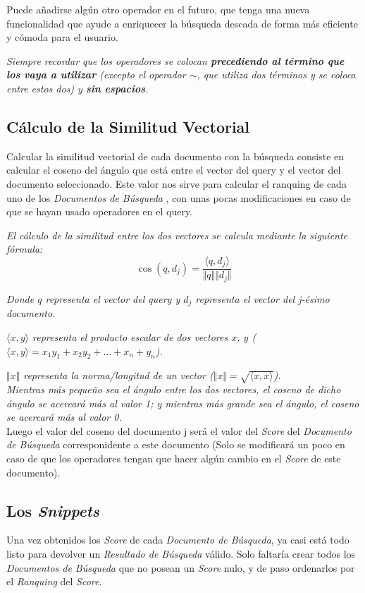 \documentclass[12pt]{article}
\newcommand{\SearchItems}{\emph{Documentos de Búsqueda} }
\newcommand{\SearchResult}{\emph{Resultado de Búsqueda} }
\begin{document}
	Puede añadirse algún otro operador en el futuro, que tenga una nueva funcionalidad que ayude a enriquecer la búsqueda deseada de forma más eficiente y cómoda para el usuario.
	
	\emph{Siempre recordar que los operadores se colocan \textbf{precediendo al término que los vaya a utilizar} (excepto el operador $\sim$, que utiliza dos términos y se coloca entre estos dos) y \textbf{sin espacios}.}
	
\subsection*{Cálculo de la Similitud Vectorial}
	Calcular la similitud vectorial de cada documento con la búsqueda consiste en calcular el coseno del ángulo que está entre el vector del query y el vector del documento seleccionado.
	Este valor nos sirve para calcular el ranquing de cada uno de los \SearchItems , con unas pocas modificaciones en caso de que se hayan usado operadores en el query.
	
	\emph{El cálculo de la similitud entre los dos vectores se calcula mediante la siguiente fórmula: }
	$$ \cos (q, d_j) = \frac{ \langle q, d_j \rangle }{ \Vert q \Vert \Vert d_j \Vert } $$
	
	\emph{Donde $q$ representa el vector del query y $d_j$ representa el vector del j-ésimo documento.}
	
	\emph{$ \langle x, y \rangle $ representa el producto escalar de dos vectores $x$, $y$ ($ \langle x, y \rangle = x_1 y_1 + x_2 y_2 + \ldots + x_n + y_n$).}
	
	\emph{$ \Vert x \Vert $ representa la norma/longitud de un vector ($ \Vert x \Vert = \sqrt{\langle x, x \rangle}$).} \\
	
	\emph{Mientras más pequeño sea el ángulo entre los dos vectores, el coseno de dicho ángulo se acercará más al valor 1; y mientras más grande sea el ángulo, el coseno se acercará más al valor 0.} \\
	
	Luego el valor del coseno del documento j será el valor del \emph{Score} del \emph{Documento de Búsqueda} corresponidente a este documento (Solo se modificará un poco en caso de que los operadores tengan que hacer algún cambio en el \emph{Score} de este documento).
	
\subsection*{Los \emph{Snippets}}
	Una vez obtenidos los \emph{Score} de cada \emph{Documento de Búsqueda}, ya casi está todo listo para devolver un \SearchResult válido.
	Solo faltaría crear todos los \SearchItems que no posean un \emph{Score} nulo, y de paso ordenarlos por el \emph{Ranquing} del \emph{Score}.
	
\end{document}
